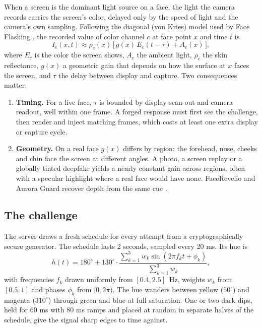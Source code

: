 \documentclass[11pt]{article}
\begin{document}
When a screen is the dominant light source on a face, the light the camera records carries the
screen's color, delayed only by the speed of light and the camera's own sampling. Following the
diagonal (von Kries) model used by Face Flashing \cite{face-flashing}, the recorded value of
color channel $c$ at face point $x$ and time $t$ is
\begin{equation}
  I_c(x, t) \approx \rho_c(x)\,\bigl[\,g(x)\,E_c(t - \tau) + A_c(x)\,\bigr],
  \label{eq:model}
\end{equation}
where $E_c$ is the color the screen shows, $A_c$ the ambient light, $\rho_c$ the skin
reflectance, $g(x)$ a geometric gain that depends on how the surface at $x$ faces the screen,
and $\tau$ the delay between display and capture. Two consequences matter:
\begin{enumerate}
  \item \textbf{Timing.} For a live face, $\tau$ is bounded by display scan-out and camera
        readout, well within one frame. A forged response must first see the challenge, then
        render and inject matching frames, which costs at least one extra display or capture
        cycle.
  \item \textbf{Geometry.} On a real face $g(x)$ differs by region: the forehead, nose, cheeks
        and chin face the screen at different angles. A photo, a screen replay or a globally
        tinted deepfake yields a nearly constant gain across regions, often with a specular
        highlight where a real face would have none. FaceRevelio and Aurora Guard recover depth
        from the same cue \cite{facerevelio,aurora-guard}.
\end{enumerate}

\subsection{The challenge}

The server draws a fresh schedule for every attempt from a cryptographically secure generator.
The schedule lasts 2 seconds, sampled every 20 ms. Its hue is
\begin{equation}
  h(t) = 180^\circ + 130^\circ \cdot
  \frac{\sum_{k=1}^{3} w_k \sin(2\pi f_k t + \phi_k)}{\sum_{k=1}^{3} w_k},
\end{equation}
with frequencies $f_k$ drawn uniformly from $[0.4, 2.5]$~Hz, weights $w_k$ from $[0.5, 1]$ and
phases $\phi_k$ from $[0, 2\pi)$. The hue wanders between yellow ($50^\circ$) and magenta ($310^\circ$) through green and blue at full
saturation. One or two dark dips, held for 60 ms with 80 ms ramps and placed at random in
separate halves of the schedule, give the signal sharp edges to time against.
\end{document}
